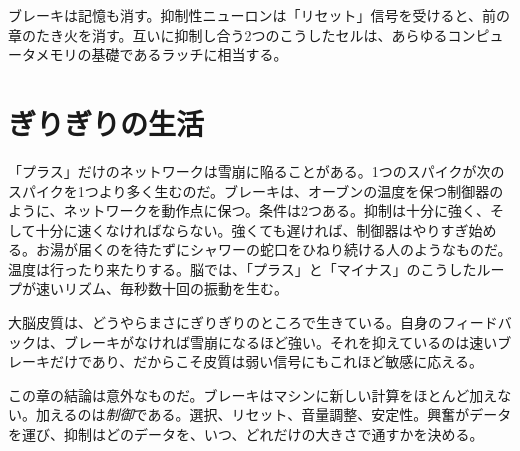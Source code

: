 ブレーキは記憶も消す。抑制性ニューロンは「リセット」信号を受けると、前の章のたき火を消す。互いに抑制し合う2つのこうしたセルは、あらゆるコンピュータメモリの基礎であるラッチに相当する。

\section*{ぎりぎりの生活}

「プラス」だけのネットワークは雪崩に陥ることがある。1つのスパイクが次のスパイクを1つより多く生むのだ。ブレーキは、オーブンの温度を保つ制御器のように、ネットワークを動作点に保つ。条件は2つある。抑制は十分に強く、そして十分に速くなければならない。強くても遅ければ、制御器はやりすぎ始める。お湯が届くのを待たずにシャワーの蛇口をひねり続ける人のようなものだ。温度は行ったり来たりする。脳では、「プラス」と「マイナス」のこうしたループが速いリズム、毎秒数十回の振動を生む。

大脳皮質は、どうやらまさにぎりぎりのところで生きている。自身のフィードバックは、ブレーキがなければ雪崩になるほど強い。それを抑えているのは速いブレーキだけであり、だからこそ皮質は弱い信号にもこれほど敏感に応える。

この章の結論は意外なものだ。ブレーキはマシンに新しい計算をほとんど加えない。加えるのは\emph{制御}である。選択、リセット、音量調整、安定性。興奮がデータを運び、抑制はどのデータを、いつ、どれだけの大きさで通すかを決める。

